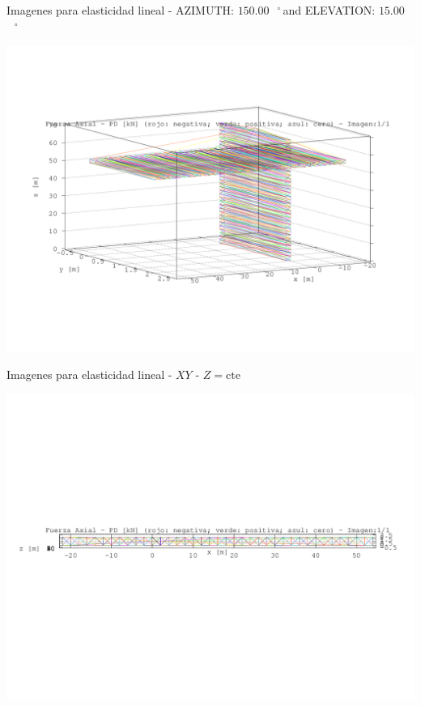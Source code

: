 \documentclass[a4paper,11pt]{article}
\newcommand{\grad}{\hspace{-2.5mm}$\,\phantom{a}^{\circ}\,$}
\begin{document}
\newpage       
\begin{center}       
Imagenes para elasticidad lineal - AZIMUTH: $150.00$\grad and ELEVATION: $ 15.00$\grad

\includegraphics[width=.80\textwidth]{../grua_fuerza_axial_1.png}      

\end{center}       
\newpage       
\begin{center}       
Imagenes para elasticidad lineal -  $XY$ - $Z=\text{cte}$ 

\includegraphics[width=.80\textwidth]{../../XY_XZ_YZ/XY/fuerza_axial/grua_fuerza_axial_XY_1.png}      

\end{center}       
\newpage       
\end{document}

